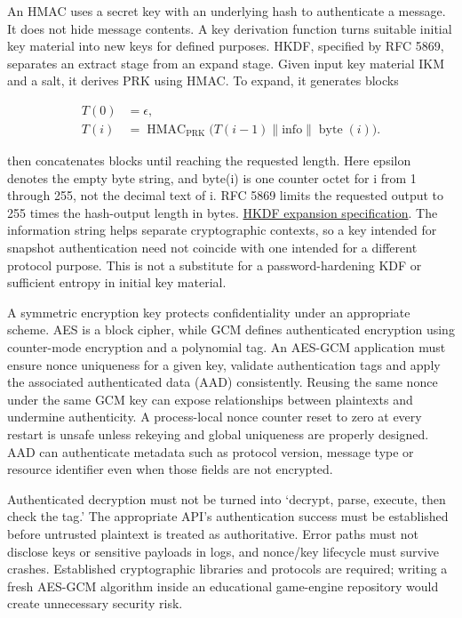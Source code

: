 An HMAC uses a secret key with an underlying hash to authenticate a message. It does not hide message contents. A key derivation function turns suitable initial key material into new keys for defined purposes. HKDF, specified by RFC 5869, separates an extract stage from an expand stage. Given input key material IKM and a salt, it derives PRK using HMAC. To expand, it generates blocks

\[
\begin{aligned}
T(0)&=\epsilon,\\
T(i)&=\operatorname{HMAC}_{\mathrm{PRK}}
\bigl(T(i-1)\parallel\mathrm{info}\parallel\operatorname{byte}(i)\bigr).
\end{aligned}
\]

then concatenates blocks until reaching the requested length. Here epsilon denotes the empty byte string, and byte(i) is one counter octet for i from 1 through 255, not the decimal text of i. RFC 5869 limits the requested output to 255 times the hash-output length in bytes. \href{https://www.rfc-editor.org/rfc/rfc5869.html\#section-2.3}{HKDF expansion specification}. The information string helps separate cryptographic contexts, so a key intended for snapshot authentication need not coincide with one intended for a different protocol purpose. This is not a substitute for a password-hardening KDF or sufficient entropy in initial key material.

A symmetric encryption key protects confidentiality under an appropriate scheme. AES is a block cipher, while GCM defines authenticated encryption using counter-mode encryption and a polynomial tag. An AES-GCM application must ensure nonce uniqueness for a given key, validate authentication tags and apply the associated authenticated data (AAD) consistently. Reusing the same nonce under the same GCM key can expose relationships between plaintexts and undermine authenticity. A process-local nonce counter reset to zero at every restart is unsafe unless rekeying and global uniqueness are properly designed. AAD can authenticate metadata such as protocol version, message type or resource identifier even when those fields are not encrypted.

Authenticated decryption must not be turned into `decrypt, parse, execute, then check the tag.' The appropriate API's authentication success must be established before untrusted plaintext is treated as authoritative. Error paths must not disclose keys or sensitive payloads in logs, and nonce/key lifecycle must survive crashes. Established cryptographic libraries and protocols are required; writing a fresh AES-GCM algorithm inside an educational game-engine repository would create unnecessary security risk.

